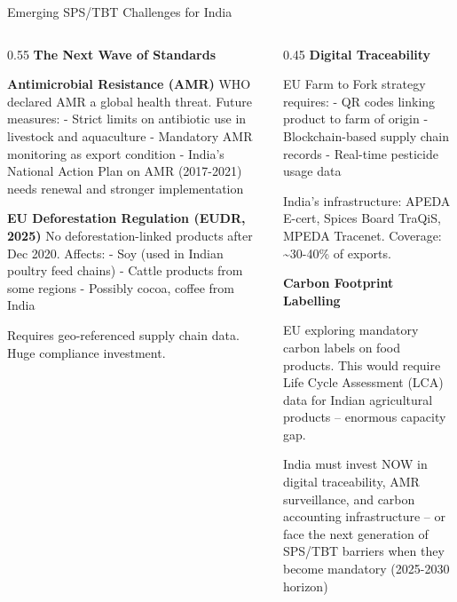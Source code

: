 \documentclass[
  ignorenonframetext,
  aspectratio=169,
]{beamer}
\makeatletter
\let\quarto@originallabel\label
\DeclareRobustCommand*{\label}[1]{\quarto@originallabel{#1}}
\makeatother
\begin{document}
\begin{frame}{Emerging SPS/TBT Challenges for India}
\label{emerging-spstbt-challenges-for-india}
\begin{columns}[T]
\begin{column}{0.55\linewidth}
\textbf{The Next Wave of Standards}

\textbf{Antimicrobial Resistance (AMR)} WHO declared AMR a global health
threat. Future measures: - Strict limits on antibiotic use in livestock
and aquaculture - Mandatory AMR monitoring as export condition - India's
National Action Plan on AMR (2017-2021) needs renewal and stronger
implementation

\textbf{EU Deforestation Regulation (EUDR, 2025)} No
deforestation-linked products after Dec 2020. Affects: - Soy (used in
Indian poultry feed chains) - Cattle products from some regions -
Possibly cocoa, coffee from India

Requires geo-referenced supply chain data. Huge compliance investment.
\end{column}

\begin{column}{0.45\linewidth}
\textbf{Digital Traceability}

EU Farm to Fork strategy requires: - QR codes linking product to farm of
origin - Blockchain-based supply chain records - Real-time pesticide
usage data

India's infrastructure: APEDA E-cert, Spices Board TraQiS, MPEDA
Tracenet. Coverage: \textasciitilde30-40\% of exports.

\textbf{Carbon Footprint Labelling}

EU exploring mandatory carbon labels on food products. This would
require Life Cycle Assessment (LCA) data for Indian agricultural
products -- enormous capacity gap.

India must invest NOW in digital traceability, AMR surveillance, and
carbon accounting infrastructure -- or face the next generation of
SPS/TBT barriers when they become mandatory (2025-2030 horizon)
\end{column}
\end{columns}
\end{frame}
\end{document}
